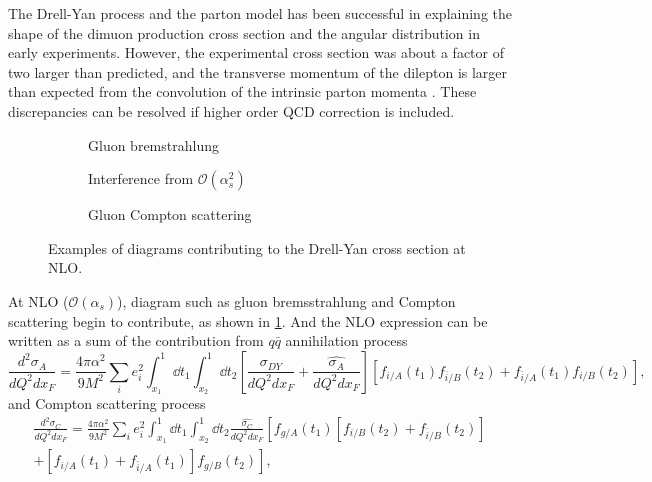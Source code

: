 \documentclass[../main.tex]{subfiles}
\begin{document}
The Drell-Yan process and the parton model has been successful in explaining the shape of
the dimuon production cross section and the angular distribution in early experiments. However,
the  experimental cross section was about a factor of two larger than predicted, and the
transverse momentum of the dilepton is larger than expected from the convolution of the intrinsic
parton momenta \cite{mcgaughey1999}. These discrepancies can be resolved if higher order
QCD correction is included.
\begin{figure}[htbp!]
	\centering
	\begin{subfigure}{0.45\linewidth}
		\centering
		
		\caption{Gluon bremstrahlung}
	\end{subfigure}
	\begin{subfigure}{0.45\linewidth}
		\centering
		
		\caption{Interference from $\mathcal{O}(\alpha^2_s)$}
	\end{subfigure}

	\begin{subfigure}{\linewidth}
		\centering
		\begin{subfigure}{0.45\linewidth}
			\centering
			
		\end{subfigure}
		\begin{subfigure}{0.45\linewidth}
			\centering
			
		\end{subfigure}
		\caption{Gluon Compton scattering}
	\end{subfigure}
	\caption{Examples of diagrams contributing to the Drell-Yan cross section
		at NLO.}
	\label{fig:NLO_DY}
\end{figure}
At NLO ($\mathcal{O}\left(\alpha_s\right)$), diagram such as gluon bremsstrahlung
and Compton scattering begin to contribute, as shown in \cref{fig:NLO_DY}.
And the NLO expression can be written as a sum of the contribution from $q\bar{q}$
annihilation process
\begin{equation}
	\frac{d^2\sigma_A}{dQ^2dx_{F}} = \frac{4\pi\alpha^2}{9M^2} \sum_i e^2_i \int^1_{x_1} \dd{t_1} \int^1_{x_2} \dd{t_2}
	\left[ \frac{\hat{\sigma_{DY}}}{dQ^2dx_F}+\frac{\hat{\sigma_{A}}}{dQ^2dx_F} \right]
	\left[f_{i/A}\left(t_1\right)f_{\bar{i}/B}\left(t_2\right) +
	f_{\bar{i}/A}\left(t_1\right)f_{i/B}\left(t_2\right)
	\right],
\end{equation}
and Compton scattering process
\begin{multline}
	\frac{d^2\sigma_C}{dQ^2dx_{F}} = \frac{4\pi\alpha^2}{9M^2} \sum_i e^2_i \int^1_{x_1} \dd{t_1} \int^1_{x_2} \dd{t_2}
	\frac{\hat{\sigma_{C}}}{dQ^2dx_F}\left[ f_{g/A}\left(t_1\right)
	\left[f_{i/B}\left(t_2\right) +f_{\bar{i}/B}\left(t_2\right) \right]\right.
	\\\left.+\left[f_{i/A}\left(t_1\right) +f_{\bar{i}/A}\left(t_1\right) \right] f_{g/B}\left(t_2\right)\right],
\end{multline}
\end{document}
